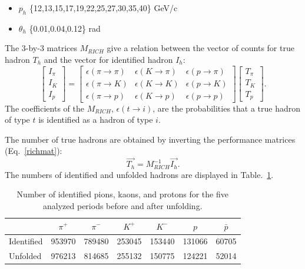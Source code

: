 \begin{itemize}
  \item $p_h$ \{12,13,15,17,19,22,25,27,30,35,40\} GeV/c
  \item $\theta_h$ \{0.01,0.04,0.12\} rad
\end{itemize}

The $3$-by-$3$ matrices $M_{RICH}$ give a relation between the vector of counts for true hadron $T_h$ and the vector for identified hadron $I_h$:
%
\begin{equation}
\begin{bmatrix}
I_{\pi} \\
I_K \\
I_p
\end{bmatrix}
=
\begin{bmatrix}
\epsilon(\pi \rightarrow \pi) & \epsilon(K \rightarrow \pi) & \epsilon(p \rightarrow \pi)\\
\epsilon(\pi \rightarrow K) & \epsilon(K \rightarrow K) & \epsilon(p \rightarrow K) \\
\epsilon(\pi \rightarrow p) & \epsilon(K \rightarrow p) & \epsilon(p \rightarrow p)
\end{bmatrix}
\begin{bmatrix}
T_{\pi} \\
T_K \\
T_p
\end{bmatrix}.
\end{equation}
%
The coefficients of the $M_{RICH}$, $\epsilon(t \rightarrow i)$, are the probabilities that a true hadron of type
$t$ is identified as a hadron of type $i$.

The number of true hadrons are obtained by inverting the performance matrices (Eq.~\ref{richmat}):
%
\begin{equation}
  \overrightarrow{T_h} = M^{-1}_{RICH}\overrightarrow{I_h}.
	\label{richmat}
\end{equation}
%
The numbers of identified and unfolded hadrons are displayed in Table.~\ref{HadNum}.
\begin{table}[!h]
  \caption{\label{HadNum} Number of identified pions, kaons, and protons for the five analyzed periods before and after unfolding.}
  \centering
  \begin{tabular}{lcccccc}
    \hline
     & $\pi^+$ & $\pi^-$ & $K^+$ & $K^-$ & $p$ & $\bar{p}$ \\
    \hline
    Identified & 953970 & 789480 & 253045 & 153440 & 131066 & 60705 \\
    Unfolded & 976213 & 814685 & 255132 & 150775 & 124221 & 52014 \\
    \hline
  \end{tabular}
\end{table}

